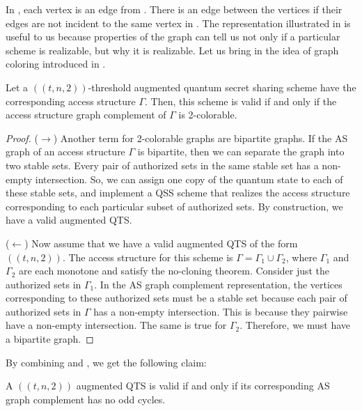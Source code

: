 In , each vertex is an edge from . There is an edge between the vertices if their edges are not incident to the same vertex in . The representation illustrated in  is useful to us because properties of the graph can tell us not only if a particular scheme is realizable, but why it is realizable. Let us bring in the idea of graph coloring introduced in .

\begin{lemma}
    \label{lem:2-color-access}
    Let a $((t,n,2))$-threshold augmented quantum secret sharing scheme have the corresponding access structure $\Gamma$. Then, this scheme is valid if and only if the access structure graph complement of $\Gamma$ is 2-colorable.
\end{lemma}

\begin{proof}
    ($\rightarrow$) Another term for 2-colorable graphs are bipartite graphs. If the AS graph of an access structure $\Gamma$ is bipartite, then we can separate the graph into two stable sets. Every pair of authorized sets in the same stable set has a non-empty intersection. So, we can assign one copy of the quantum state to each of these stable sets, and implement a QSS scheme that realizes the access structure corresponding to each particular subset of authorized sets. By construction, we have a valid augmented QTS.
    
    ($\leftarrow$) Now assume that we have a valid augmented QTS of the form $((t,n,2))$. The access structure for this scheme is $\Gamma = \Gamma_1 \cup \Gamma_2$, where $\Gamma_1$ and $\Gamma_2$ are each monotone and satisfy the no-cloning theorem. Consider just the authorized sets in $\Gamma_1$. In the AS graph complement representation, the vertices corresponding to these authorized sets must be a stable set because each pair of authorized sets in $\Gamma$ has a non-empty intersection. This is because they pairwise have a non-empty intersection. The same is true for $\Gamma_2$. Therefore, we must have a bipartite graph.
\end{proof}

By combining  and , we get the following claim:

\begin{corollary}
    \label{cor:oddcycle-valid}
    A $((t,n,2))$ augmented QTS is valid if and only if its corresponding AS graph complement has no odd cycles.
\end{corollary}

